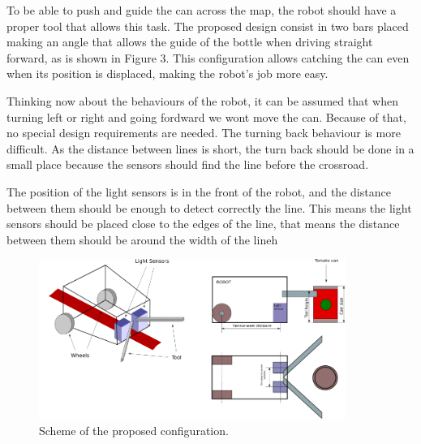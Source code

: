 \documentclass[12pt,a4paper]{article}
\begin{document}
To be able to push and guide the can across the map, the robot should have a proper tool that allows this task. 
The proposed design consist in two bars placed making an angle that allows the guide of the bottle when driving straight forward, as is shown in Figure 3. This configuration allows catching the can even when its position is displaced, making the robot's job more easy.

Thinking now about the behaviours of the robot, it can be assumed that when turning left or right and going fordward we wont move the can. Because of that, no special design requirements are needed. The turning back behaviour is more difficult. As the distance between lines is short, the turn back should be done in a small place because the sensors should find the line before the crossroad.

The position of the light sensors is in the front of the robot, and the distance between them should be enough to detect correctly the line. This means the light sensors should be placed close to the edges of the line, that means the distance between them should be around the width of the lineh



\begin{figure}[t]
\includegraphics[width=10cm]{Fig2.png}
\centering
\caption{Scheme of the proposed configuration.}
\end{figure}

\end{document}
